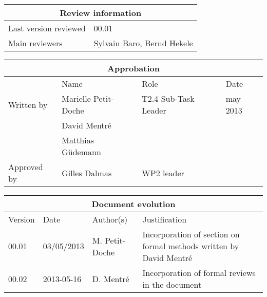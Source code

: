 \documentclass{template/openetcs_article}
\begin{document}
\begin{tabular}{|p{4.4cm}|p{8.7cm}|}
\hline
\multicolumn{2}{|c|}{Review information} \\
\hline
Last version reviewed & 00.01 \\
\hline
Main reviewers & Sylvain Baro, Bernd Hekele \\
\hline
\end{tabular}

\begin{tabular}{|p{2.2cm}|p{4cm}|p{4cm}|p{2cm}|}
\hline
\multicolumn{4}{|c|}{Approbation} \\
\hline
  &  Name & Role & Date   \\
\hline  
Written by    &  Marielle Petit-Doche & T2.4 Sub-Task Leader  & may 2013 \\
& David Mentré & & \\
& Matthias Güdemann & & \\
\hline
Approved by & Gilles Dalmas & WP2 leader & \\
\hline
\end{tabular}

\begin{tabular}{|p{2.2cm}|p{2cm}|p{3cm}|p{5cm}|}
\hline
\multicolumn{4}{|c|}{Document evolution} \\
\hline
Version &  Date & Author(s) & Justification  \\
\hline  
00.01 & 03/05/2013 & M. Petit-Doche &  Incorporation of section on formal methods written by David Mentré \\
\hline  
00.02 & 2013-05-16 & D. Mentré &  Incorporation of formal reviews in
the document \\
\hline  

\end{tabular}



\newcommand{\tbd}{\colorbox{cyan}{\%\%To Be Defined\%\%}}
\newcommand{\tbc}{\colorbox{cyan}{\%\%To Be Confirmed\%\%}}
\newcommand{\todo}[1]{\colorbox{cyan}{\%\%{#1}\%\%}}
\newlength{\origindent}

\newenvironment{issue}{
	\begin{quote}
	\begin{itshape}Open Issue. 
}{
	\end{itshape}
	\end{quote}
}
\end{document}

